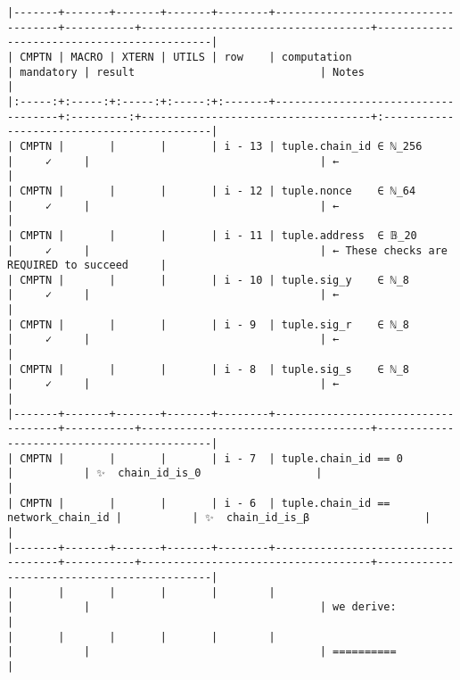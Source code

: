 \documentclass[varwidth=\maxdimen,margin=0.5cm,multi={verbatim}]{standalone}
\begin{document}
\begin{verbatim}
|-------+-------+-------+-------+--------+------------------------------------+-----------+------------------------------------+--------------------------------------------|
| CMPTN | MACRO | XTERN | UTILS | row    | computation                        | mandatory | result                             | Notes                                      |
|:-----:+:-----:+:-----:+:-----:+:-------+------------------------------------+:---------:+------------------------------------+:-------------------------------------------|
| CMPTN |       |       |       | i - 13 | tuple.chain_id ∈ ℕ_256             |     ✓     |                                    | ←                                          |
| CMPTN |       |       |       | i - 12 | tuple.nonce    ∈ ℕ_64              |     ✓     |                                    | ←                                          |
| CMPTN |       |       |       | i - 11 | tuple.address  ∈ 𝔹_20              |     ✓     |                                    | ← These checks are REQUIRED to succeed     |
| CMPTN |       |       |       | i - 10 | tuple.sig_y    ∈ ℕ_8               |     ✓     |                                    | ←                                          |
| CMPTN |       |       |       | i - 9  | tuple.sig_r    ∈ ℕ_8               |     ✓     |                                    | ←                                          |
| CMPTN |       |       |       | i - 8  | tuple.sig_s    ∈ ℕ_8               |     ✓     |                                    | ←                                          |
|-------+-------+-------+-------+--------+------------------------------------+-----------+------------------------------------+--------------------------------------------|
| CMPTN |       |       |       | i - 7  | tuple.chain_id == 0                |           | ✨  chain_id_is_0                  |                                            |
| CMPTN |       |       |       | i - 6  | tuple.chain_id == network_chain_id |           | ✨  chain_id_is_β                  |                                            |
|-------+-------+-------+-------+--------+------------------------------------+-----------+------------------------------------+--------------------------------------------|
|       |       |       |       |        |                                    |           |                                    | we derive:                                 |
|       |       |       |       |        |                                    |           |                                    | ==========                                 |

\end{verbatim}
\end{document}
